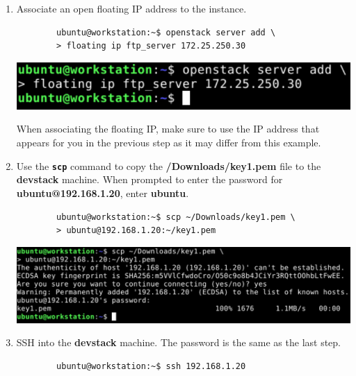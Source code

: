 \documentclass[letterpaper, 12pt]{article}
\begin{document}
\begin{enumerate}
    \item Associate an open floating IP address to the instance.
    \begin{lstlisting}
        ubuntu@workstation:~$ openstack server add \
        > floating ip ftp_server 172.25.250.30
    \end{lstlisting}

    \begin{center}
        \includegraphics[width=\linewidth]{images/part1/step38.png}
    \end{center}

    \begin{notebox}
        When associating the floating IP, make sure to use the IP address that appears for you in the previous step as
        it may differ from this example.
    \end{notebox}

    \item Use the \textbf{\texttt{scp}} command to copy the \textbf{\texttildemid/Downloads/key1.pem} file to the
    \textbf{devstack} machine. When prompted to enter the password for \textbf{ubuntu@192.168.1.20}, enter
    \textbf{ubuntu}.
    \begin{lstlisting}
        ubuntu@workstation:~$ scp ~/Downloads/key1.pem \
        > ubuntu@192.168.1.20:~/key1.pem
    \end{lstlisting}

    \begin{center}
        \includegraphics[width=\linewidth]{images/part1/step39.png}
    \end{center}

    \item SSH into the \textbf{devstack} machine. The password is the same as the last step.
    \begin{lstlisting}
        ubuntu@workstation:~$ ssh 192.168.1.20
    \end{lstlisting}


\end{enumerate}
\end{document}
